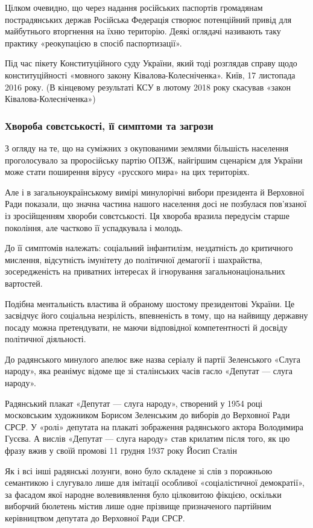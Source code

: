 Цілком очевидно, що через надання російських паспортів громадянам
пострадянських держав Російська Федерація створює потенційний привід для
майбутнього вторгнення на їхню територію. Деякі оглядачі називають таку
практику «реокупацією в спосіб паспортизації».

Під час пікету Конституційного суду України, який тоді розглядав справу щодо
конституційності «мовного закону Ківалова-Колесніченка». Київ, 17 листопада
2016 року. (В кінцевому результаті КСУ в лютому 2018 року скасував «закон
Ківалова-Колесніченка»)

\subsubsection{Хвороба совєтськості, її симптоми та загрози}

З огляду на те, що на суміжних з окупованими землями більшість населення
проголосувало за проросійську партію ОПЗЖ, найгіршим сценарієм для України може
стати поширення вірусу «русского мира» на цих територіях.

Але і в загальноукраїнському вимірі минулорічні вибори президента й Верховної
Ради показали, що значна частина нашого населення досі не позбулася пов’язаної
із зросійщенням хвороби совєтськості. Ця хвороба вразила передусім старше
покоління, але частково її успадкувала і молодь.

До її симптомів належать: соціальний інфантилізм, нездатність до критичного
мислення, відсутність імунітету до політичної демагогії і шахрайства,
зосередженість на приватних інтересах й ігнорування загальнонаціональних
вартостей.

Подібна ментальність властива й обраному шостому президентові України. Це
засвідчує його соціальна незрілість, впевненість в тому, що на найвищу державну
посаду можна претендувати, не маючи відповідної компетентності й досвіду
політичної діяльності.

До радянського минулого апелює вже назва серіалу й партії Зеленського «Слуга
народу», яка реанімує відоме ще зі сталінських часів гасло «Депутат --- слуга
народу».


Радянський плакат «Депутат --- слуга народу», створений у 1954 році московським
художником Борисом Зеленським до виборів до Верховної Ради СРСР. У «ролі»
депутата на плакаті зображення радянського актора Володимира Гусєва. А вислів
«Депутат --- слуга народу» став крилатим після того, як цю фразу вжив у своїй
промові 11 грудня 1937 року Йосип Сталін

Як і всі інші радянські лозунги, воно було складене зі слів з порожньою
семантикою і слугувало лише для імітації особливої «соціалістичної демократії»,
за фасадом якої народне волевиявлення було цілковитою фікцією, оскільки
виборчий бюлетень містив лише одне прізвище призначеного партійним керівництвом
депутата до Верховної Ради СРСР.

